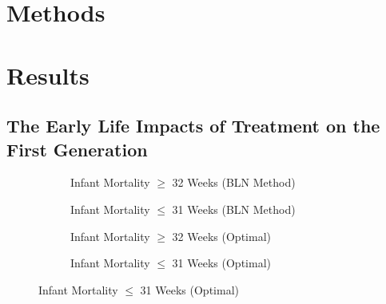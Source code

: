 \documentclass[11pt]{article}
\begin{document}
\begin{spacing}{1.5}
  
  
  
  
  

  
  \clearpage
  \section{Methods}
  \citet{Almondetal2010,Bharadwajetal2013}

  \citet{Calonicoetal2020a,Calonicoetal2014}
  
  \citet{Barrecaetal2011}

  \citet{RomanoWolf2005}
  
  \clearpage
  \section{Results}
  \subsection{The Early Life Impacts of Treatment on the First Generation}
  \begin{figure}[htpb!]
    \caption{Birthweight Assignment Thresholds and Infant Mortality}
    \label{fig:IMR}
    \begin{subfigure}{.45\textwidth}
      \centering
      \caption{Infant Mortality $\geq$ 32 Weeks (BLN Method)}
      \label{fig:IMRBLN32}
    \end{subfigure}
    \begin{subfigure}{.45\textwidth}
      \centering
      \caption{Infant Mortality $\leq$ 31 Weeks (BLN Method)}
      \label{fig:IMRBLN31}
    \end{subfigure}

    \begin{subfigure}{.45\textwidth}
      \centering
      \caption{Infant Mortality $\geq$ 32 Weeks (Optimal)}
      \label{fig:IMROPT32}
    \end{subfigure}
    \begin{subfigure}{.45\textwidth}
      \centering
      \caption{Infant Mortality $\leq$ 31 Weeks (Optimal)}
      \label{fig:IMROPT31}
    \end{subfigure}


\end{figure}
\end{spacing}
\end{document}
